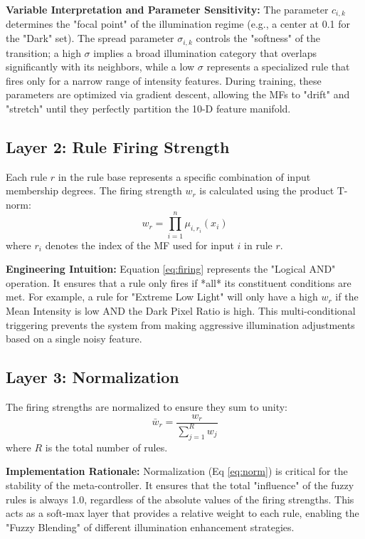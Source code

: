 \textbf{Variable Interpretation and Parameter Sensitivity:} The parameter $c_{i,k}$ determines the "focal point" of the illumination regime (e.g., a center at 0.1 for the "Dark" set). The spread parameter $\sigma_{i,k}$ controls the "softness" of the transition; a high $\sigma$ implies a broad illumination category that overlaps significantly with its neighbors, while a low $\sigma$ represents a specialized rule that fires only for a narrow range of intensity features. During training, these parameters are optimized via gradient descent, allowing the MFs to "drift" and "stretch" until they perfectly partition the 10-D feature manifold.
    
\subsection{Layer 2: Rule Firing Strength}
Each rule $r$ in the rule base represents a specific combination of input membership degrees. The firing strength $w_r$ is calculated using the product T-norm:
\begin{equation}
    w_r = \prod_{i=1}^n \mu_{i, r_i}(x_i)
    \label{eq:firing}
\end{equation}
where $r_i$ denotes the index of the MF used for input $i$ in rule $r$.

\textbf{Engineering Intuition:} Equation \ref{eq:firing} represents the "Logical AND" operation. It ensures that a rule only fires if *all* its constituent conditions are met. For example, a rule for "Extreme Low Light" will only have a high $w_r$ if the Mean Intensity is low AND the Dark Pixel Ratio is high. This multi-conditional triggering prevents the system from making aggressive illumination adjustments based on a single noisy feature.

\subsection{Layer 3: Normalization}
The firing strengths are normalized to ensure they sum to unity:
\begin{equation}
    \bar{w}_r = \frac{w_r}{\sum_{j=1}^R w_j}
    \label{eq:norm}
\end{equation}
where $R$ is the total number of rules.

\textbf{Implementation Rationale:} Normalization (Eq \ref{eq:norm}) is critical for the stability of the meta-controller. It ensures that the total "influence" of the fuzzy rules is always 1.0, regardless of the absolute values of the firing strengths. This acts as a soft-max layer that provides a relative weight to each rule, enabling the "Fuzzy Blending" of different illumination enhancement strategies.

